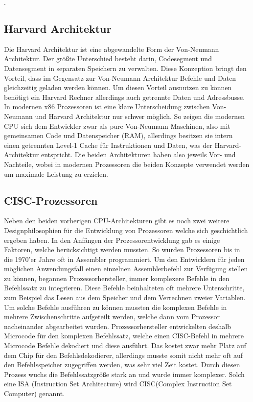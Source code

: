 \documentclass[12pt]{article}
\begin{document}
\cite{unikoelnvnz}.
\subsection{Harvard Architektur} 
Die Harvard Architektur ist eine abgewandelte Form der Von-Neumann Architektur. Der größte Unterschied besteht darin, Codesegment und Datensegment in separaten Speichern zu verwalten. Diese Konzeption bringt den Vorteil, dass im Gegensatz zur Von-Neumann Architektur Befehle und Daten gleichzeitig geladen werden können. Um diesen Vorteil ausnutzen zu können benötigt ein Harvard Rechner allerdings auch getrennte Daten und Adressbusse. 
\newline
\newline
In modernen x86 Prozessoren ist eine klare Unterscheidung zwischen Von-Neumann und Harvard Architektur nur schwer möglich. So zeigen die modernen CPU sich dem Entwickler zwar als pure Von-Neumann Maschinen, also mit gemeinsamen Code und Datenspeicher (RAM), allerdings besitzen sie intern einen getrennten Level-1 Cache für Instruktionen und Daten, was der Harvard-Architektur entspricht. Die beiden Architekturen haben also jeweils Vor- und Nachteile, wobei in modernen Prozessoren die beiden Konzepte verwendet werden um maximale Leistung zu erzielen.
\subsection{CISC-Prozessoren}
Neben den beiden vorherigen CPU-Architekturen gibt es noch zwei weitere Designphilosophien für die Entwicklung von Prozessoren welche sich geschichtlich ergeben haben. In den Anfängen der Prozessorentwicklung gab es einige Faktoren, welche berücksichtigt werden mussten. So wurden Prozessoren bis in die 1970'er Jahre oft in Assembler programmiert. Um den Entwicklern für jeden möglichen Anwendungsfall einen einzelnen Assemblerbefehl zur Verfügung stellen zu können, begannen Prozessorhersteller, immer komplexere Befehle in den Befehlssatz zu integrieren. Diese Befehle beinhalteten oft mehrere Unterschritte, zum Beispiel das Lesen aus dem Speicher und dem Verrechnen zweier Variablen. Um solche Befehle ausführen zu können mussten die komplexen Befehle in mehrere Zwischenschritte aufgeteilt werden, welche dann vom Prozessor nacheinander abgearbeitet wurden. Prozessorhersteller entwickelten deshalb Microcode für den komplexen Befehlssatz, welche einen CISC-Befehl in mehrere Microcode Befehle dekodiert und diese ausführt. Das kostet zwar mehr Platz auf dem Chip für den Befehlsdekodierer, allerdings musste somit nicht mehr oft auf den Befehlsspeicher zugegriffen werden, was sehr viel Zeit kostet. Durch diesen Prozess wuchs die Befehlssatzgröße stark an und wurde immer komplexer. Solch eine ISA (Instruction Set Architecture) wird CISC(Complex Instruction Set Computer) genannt.	
\end{document}

